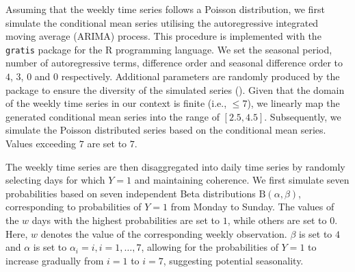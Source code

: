 \documentclass[a4paper,review,12pt,authoryear]{elsarticle}
\let\code=\texttt
\let\proglang=\textsf
\theoremstyle{definition}
\begin{document}
     Assuming that the weekly time series follows a Poisson distribution, we first simulate the conditional mean series utilising the autoregressive integrated moving average (ARIMA) process. This procedure is implemented with the \code{gratis} package \citep{gratis}
     for the \proglang{R} programming language. We set the seasonal period, number of autoregressive terms, difference order and seasonal difference order to $4$, $3$, $0$ and $0$ respectively. 
     Additional parameters are randomly produced by the package to ensure the diversity of the simulated series ().
     Given that the domain of the weekly time series in our context is finite (i.e., $\leq 7$), we linearly map the generated conditional mean series into the range of $[2.5, 4.5]$.
     Subsequently, we simulate the Poisson distributed series based on the conditional mean series. Values exceeding $7$ are set to $7$.


     The weekly time series are then disaggregated into daily time series by randomly selecting days for which $Y=1$ and maintaining coherence.
     We first simulate seven probabilities based on seven independent Beta distributions $\textrm{B}(\alpha, \beta)$, corresponding to probabilities of $Y=1$ from Monday to Sunday.
     The values of the $w$ days with the highest probabilities are set to $1$, while others are set to $0$. Here, $w$ denotes the value of the corresponding weekly observation.
     $\beta$ is set to $4$ and $\alpha$ is set to $\alpha_i = i, i=1,\dots,7$, allowing for the probabilities of $Y=1$ to increase gradually from $i=1$ to $i=7$, suggesting potential seasonality.
\end{document}
